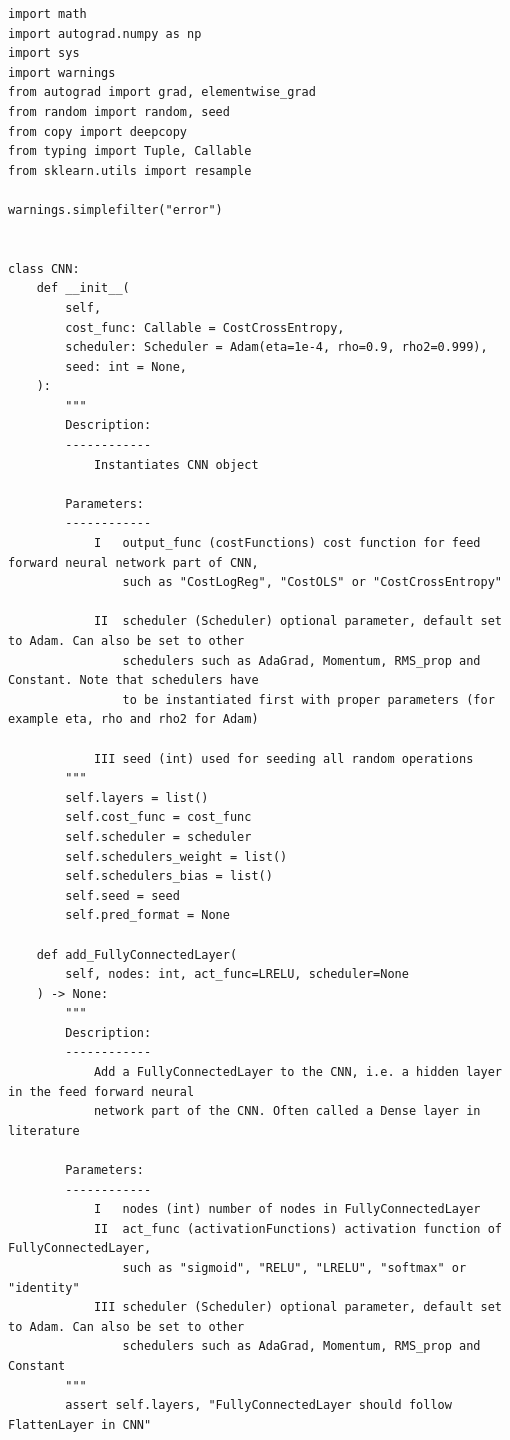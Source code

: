 \documentclass[%
oneside,                 %
final,                   %
10pt]{article}
\begin{document}
\begin{verbatim}
import math
import autograd.numpy as np
import sys
import warnings
from autograd import grad, elementwise_grad
from random import random, seed
from copy import deepcopy
from typing import Tuple, Callable
from sklearn.utils import resample

warnings.simplefilter("error")


class CNN:
    def __init__(
        self,
        cost_func: Callable = CostCrossEntropy,
        scheduler: Scheduler = Adam(eta=1e-4, rho=0.9, rho2=0.999),
        seed: int = None,
    ):
        """
        Description:
        ------------
            Instantiates CNN object

        Parameters:
        ------------
            I   output_func (costFunctions) cost function for feed forward neural network part of CNN,
                such as "CostLogReg", "CostOLS" or "CostCrossEntropy"

            II  scheduler (Scheduler) optional parameter, default set to Adam. Can also be set to other
                schedulers such as AdaGrad, Momentum, RMS_prop and Constant. Note that schedulers have
                to be instantiated first with proper parameters (for example eta, rho and rho2 for Adam)

            III seed (int) used for seeding all random operations
        """
        self.layers = list()
        self.cost_func = cost_func
        self.scheduler = scheduler
        self.schedulers_weight = list()
        self.schedulers_bias = list()
        self.seed = seed
        self.pred_format = None

    def add_FullyConnectedLayer(
        self, nodes: int, act_func=LRELU, scheduler=None
    ) -> None:
        """
        Description:
        ------------
            Add a FullyConnectedLayer to the CNN, i.e. a hidden layer in the feed forward neural
            network part of the CNN. Often called a Dense layer in literature

        Parameters:
        ------------
            I   nodes (int) number of nodes in FullyConnectedLayer
            II  act_func (activationFunctions) activation function of FullyConnectedLayer,
                such as "sigmoid", "RELU", "LRELU", "softmax" or "identity"
            III scheduler (Scheduler) optional parameter, default set to Adam. Can also be set to other
                schedulers such as AdaGrad, Momentum, RMS_prop and Constant
        """
        assert self.layers, "FullyConnectedLayer should follow FlattenLayer in CNN"


\end{verbatim}
\end{document}
